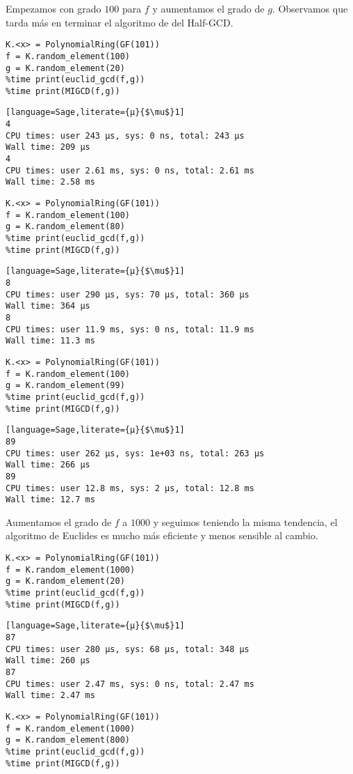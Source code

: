 \documentclass[10pt]{article}
\theoremstyle{definition}
\begin{document}
Empezamos con grado $100$ para $f$ y aumentamos el grado de $g$. Observamos que tarda más en terminar el algoritmo de del Half-GCD.
\begin{lstlisting}[language=Sage]
K.<x> = PolynomialRing(GF(101))
f = K.random_element(100)
g = K.random_element(20)
%time print(euclid_gcd(f,g))
%time print(MIGCD(f,g))
\end{lstlisting}
\begin{lstlisting}[language=Sage,literate={µ}{$\mu$}1]
4
CPU times: user 243 µs, sys: 0 ns, total: 243 µs
Wall time: 209 µs
4
CPU times: user 2.61 ms, sys: 0 ns, total: 2.61 ms
Wall time: 2.58 ms
\end{lstlisting}
\begin{lstlisting}[language=Sage]
K.<x> = PolynomialRing(GF(101))
f = K.random_element(100)
g = K.random_element(80)
%time print(euclid_gcd(f,g))
%time print(MIGCD(f,g))
\end{lstlisting}
\begin{lstlisting}[language=Sage,literate={µ}{$\mu$}1]
8
CPU times: user 290 µs, sys: 70 µs, total: 360 µs
Wall time: 364 µs
8
CPU times: user 11.9 ms, sys: 0 ns, total: 11.9 ms
Wall time: 11.3 ms
\end{lstlisting}
\begin{lstlisting}[language=Sage]
K.<x> = PolynomialRing(GF(101))
f = K.random_element(100)
g = K.random_element(99)
%time print(euclid_gcd(f,g))
%time print(MIGCD(f,g))
\end{lstlisting}
\begin{lstlisting}[language=Sage,literate={µ}{$\mu$}1]
89
CPU times: user 262 µs, sys: 1e+03 ns, total: 263 µs
Wall time: 266 µs
89
CPU times: user 12.8 ms, sys: 2 µs, total: 12.8 ms
Wall time: 12.7 ms
\end{lstlisting}
Aumentamos el grado de $f$ a $1000$ y seguimos teniendo la misma tendencia, el algoritmo de Euclides es mucho más eficiente y menos sensible al cambio.
\begin{lstlisting}[language=Sage]
K.<x> = PolynomialRing(GF(101))
f = K.random_element(1000)
g = K.random_element(20)
%time print(euclid_gcd(f,g))
%time print(MIGCD(f,g))
\end{lstlisting}
\begin{lstlisting}[language=Sage,literate={µ}{$\mu$}1]
87
CPU times: user 280 µs, sys: 68 µs, total: 348 µs
Wall time: 260 µs
87
CPU times: user 2.47 ms, sys: 0 ns, total: 2.47 ms
Wall time: 2.47 ms
\end{lstlisting}
\begin{lstlisting}[language=Sage]
K.<x> = PolynomialRing(GF(101))
f = K.random_element(1000)
g = K.random_element(800)
%time print(euclid_gcd(f,g))
%time print(MIGCD(f,g))
\end{lstlisting}
\end{document}
